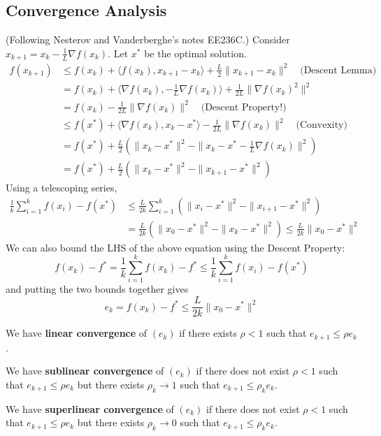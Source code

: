 \documentclass[english, 11pt]{article}
\begin{document}
\subsection{Convergence Analysis}
(Following Nesterov and Vanderberghe's notes EE236C.)
Consider $x_{k+1} = x_k - \frac{1}{L} \nabla f(x_k)$. Let $x^*$ be the optimal solution. 
\begin{align*}
f(x_{k+1}) &\le f(x_k) + \langle f(x_k), x_{k+1}-x_k \rangle + \frac{L}{2} \|x_{k+1} - x_k\|^2 \quad \text{(Descent Lemma)} \\
&= f(x_k) + \langle \nabla f(x_k), - \frac{1}{L} \nabla f(x_k) \rangle + \frac{1}{2L} \| \nabla f(x_k)^2 \|^2 \\
&= f(x_k) - \frac{1}{2L} \| \nabla f(x_k)\|^2 \quad \text{(Descent Property!)} \\
& \le f(x^*) + \langle \nabla f(x_k), x_k - x^* \rangle - \frac{1}{2L} \|\nabla f(x_k) \|^2 \quad \text{(Convexity)} \\
&= f(x^*) + \frac{L}{2} \left( \|x_k - x^*\|^2 - \|x_k - x^* - \frac{1}{L} \nabla f(x_k) \|^2 \right) \\
&= f(x^*) + \frac{L}{2} \left( \|x_k - x^*\|^2 - \|x_{k+1} - x^* \|^2 \right) 
\end{align*}
Using a telescoping series,
\begin{align*}
\frac{1}{k} \sum_{i=1}^k f(x_i) - f(x^*) &\le  \frac{L}{2k} \sum_{i=1}^k \left( \|x_i - x^*\|^2 - \|x_{i+1} - x^* \|^2 \right)  \\
& = \frac{L}{2k} \left( \|x_0 - x^*\|^2 - \|x_k - x^*\|^2 \right) \le \frac{L}{2k} \|x_0 - x^*\|^2
\end{align*}
We can also bound the LHS of the above equation using the Descent Property:
\[
f(x_k) - f^*  = \frac{1}{k} \sum_{i=1}^k f(x_k) - f^*  \le \frac{1}{k} \sum_{i=1}^k f(x_i) - f(x^*)
\]
and putting the two bounds together gives
\[
e_k = f(x_k) - f^* \le \frac{L}{2k} \|x_0 - x^*\|^2
\]
\begin{defn}
We have {\bf linear convergence} of $(e_k)$ if there exists $\rho<1$ such that $e_{k+1} \le \rho e_k$.
\end{defn}

\begin{defn}
We have {\bf sublinear convergence} of $(e_k)$ if there does not exist $\rho <1$ such that $e_{k+1} \le \rho e_k$ but there exists $\rho_k \to 1$ such that $e_{k+1} \le \rho_k e_k$.
\end{defn}

\begin{defn}
We have {\bf superlinear convergence} of $(e_k)$ if there does not exist $\rho <1$ such that $e_{k+1} \le \rho e_k$ but there exists $\rho_k \to 0$ such that $e_{k+1} \le \rho_k e_k$.
\end{defn}
\end{document}
